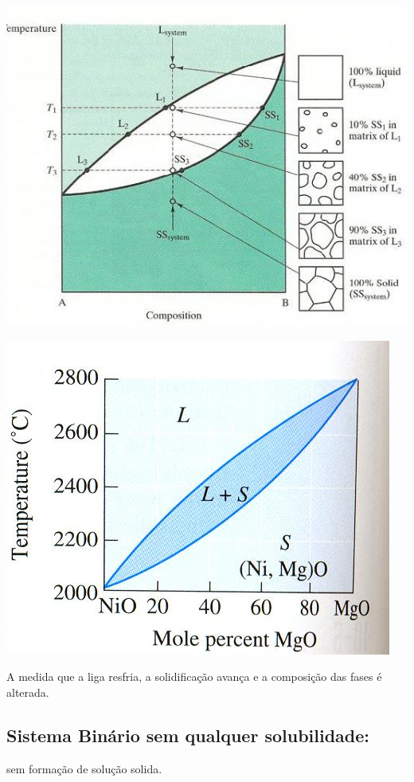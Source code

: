 \includegraphics[scale=0.4,trim={0 0 0 0}]{figures/fases2}

\includegraphics[scale=0.3,trim={0 0 0 0}]{figures/subsCompos}

A medida que a liga resfria, a solidificação avança e a composição das fases é alterada.




\subsection{ Sistema Binário sem qualquer solubilidade:} 
 
 sem formação de solução solida.

